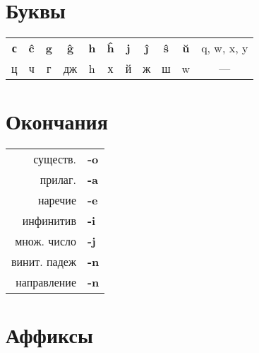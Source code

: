 \documentclass{article}
\def\b#1{\textbf{#1}}
\begin{document}
\section{Буквы}

\begin{tabular}{ccccccccccc}
\b{с} & \b{ĉ} & \b{g} & \b{ĝ} & \b{h} & \b{ĥ} & \b{j} & \b{ĵ} & \b{ŝ} & \b{ŭ} & q, w, x, y \\
ц & ч & г & дж & h & х & й & ж & ш & w & --- \\
\end{tabular}

\section{Окончания}

\begin{tabular}{r>{\bfseries}l}
существ. & -o \\
прилаг. & -a \\
наречие & -e \\
инфинитив & -i \\
множ. число & -j \\
винит. падеж & -n \\
направление & -n \\
\end{tabular}

\section{Аффиксы}
\end{document}
